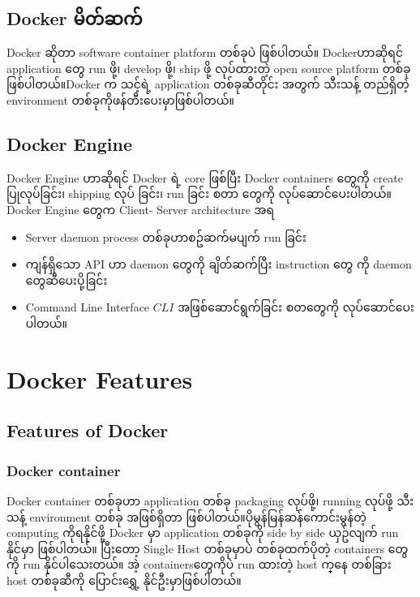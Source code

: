 \documentclass{article}
\begin{document}
\subsection{Docker မိတ်ဆက်}\label{docker-}

Docker ဆိုတာ software container platform တစ်ခုပဲ ဖြစ်ပါတယ်။ Dockerဟာဆိုရင် application ​တွေ run ဖို့၊ develop ဖို့၊ ship ဖို့ လုပ်ထားတဲ့ open source platform တစ်ခုဖြစ်ပါတယ်။Docker က သင့်ရဲ့ application
တစ်ခုဆီတိုင်း အတွက် သီးသန့် တည်ရှိတဲ့ environment တစ်ခုကိုဖန်တီး​ပေးမှာဖြစ်ပါတယ်။

\subsection{Docker Engine}\label{docker-engine}

Docker Engine ဟာဆိုရင် Docker ရဲ့ core ဖြစ်ပြီး Docker containers
​တွေကို create ပြုလုပ်​ခြင်း၊ shipping လုပ် ခြင်း၊ run ခြင်း စတာ ​တွေကို
လုပ်​ဆောင်​ပေးပါတယ်။ Docker Engine ​တွေက Client- Server architecture အရ

\begin{itemize}
\itemsep1pt\parskip0pt
\item
  Server daemon process တစ်ခုဟာစဥ်ဆက်မပျက် run ခြင်း\\
\item
  ကျန်ရှိ​သော API ဟာ daemon ​တွေကို ချိတ်ဆက်ပြီး instruction ​တွေ ကို
  daemon ​တွေဆီ ​ပေးပို့ခြင်း\\
\item
  Command Line Interface $CLI$ အဖြစ်​ဆောင်ရွက်ခြင်း စတ​တွေကို
  လုပ်​ဆောင်​ပေးပါတယ်။
\end{itemize}

\pagebreak


\section{Docker Features}\label{docker-features}

\subsection{Features of Docker}\label{features-of-docker}

\subsubsection{Docker container}\label{docker-container}

Docker container တစ်ခုဟာ application တစ်ခု packaging လုပ်ဖို့၊ running
လုပ်ဖို့ သီးသန့် environment တစ်ခု အဖြစ်​ရှိ​တာ
ဖြစ်ပါတယ်။ပိုမွန်​မြန်ဆန်​ကောင်းမွန်တဲ့ computing ကိုရနိုင်ဖို့ Docker
မှာ application တစ်ခုကို side by side ယှဥ်လျက် run နိုင်မှာ ဖြစ်ပါတယ်။
ပြီး​တော့ Single Host တစ်ခုမှာပဲ တစ်ခုထက်ပိုတဲ့ containers ​တွေကို run
နိုင်ပါ​သေးတယ်။ အဲ့ containers ​တွေကိုပဲ run ထားတဲ့ host က္​နေ တစ်ခြား
host တစ်ခုဆီကို ​ပြောင်း​​ရွှေ့ နိုင်ဦးမှာဖြစ်ပါတယ်။
\end{document}

